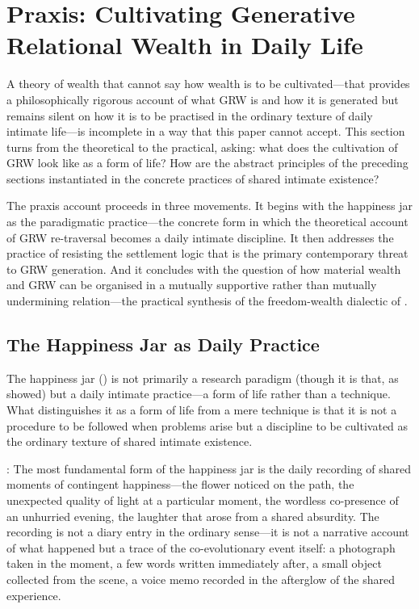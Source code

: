 \section{Praxis: Cultivating Generative Relational Wealth in Daily Life}
\label{p15:sec:praxis}

\noindent
A theory of wealth that cannot say how wealth is to be cultivated---that provides a philosophically rigorous account of what GRW is and how it is generated but remains silent on how it is to be practised in the ordinary texture of daily intimate life---is incomplete in a way that this paper cannot accept. This section turns from the theoretical to the practical, asking: what does the cultivation of GRW look like as a form of life? How are the abstract principles of the preceding sections instantiated in the concrete practices of shared intimate existence?

The praxis account proceeds in three movements. It begins with the happiness jar as the paradigmatic practice---the concrete form in which the theoretical account of GRW re-traversal becomes a daily intimate discipline. It then addresses the practice of resisting the settlement logic that is the primary contemporary threat to GRW generation. And it concludes with the question of how material wealth and GRW can be organised in a mutually supportive rather than mutually undermining relation---the practical synthesis of the freedom-wealth dialectic of .

\subsection{The Happiness Jar as Daily Practice}
\label{p15:subsec:jar_practice}

\noindent
The happiness jar () is not primarily a research paradigm (though it is that, as  showed) but a daily intimate practice---a form of life rather than a technique. What distinguishes it as a form of life from a mere technique is that it is not a procedure to be followed when problems arise but a discipline to be cultivated as the ordinary texture of shared intimate existence.

: The most fundamental form of the happiness jar is the daily recording of shared moments of contingent happiness---the flower noticed on the path, the unexpected quality of light at a particular moment, the wordless co-presence of an unhurried evening, the laughter that arose from a shared absurdity. The recording is not a diary entry in the ordinary sense---it is not a narrative account of what happened but a trace of the co-evolutionary event itself: a photograph taken in the moment, a few words written immediately after, a small object collected from the scene, a voice memo recorded in the afterglow of the shared experience.

